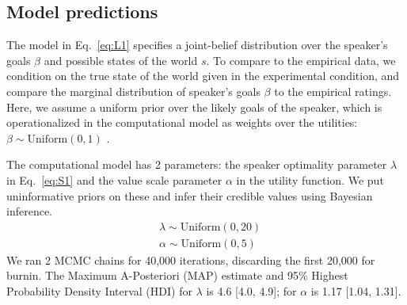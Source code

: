 \documentclass[10pt,letterpaper]{article}
\begin{document}
\subsection{Model predictions}

The model in Eq.~\ref{eq:L1} specifies a joint-belief distribution over the speaker's goals $\beta$ and possible states of the world $s$.
To compare to the empirical data, we condition on the true state of the world given in the experimental condition, and compare the marginal distribution of speaker's goals $\beta$ to the empirical ratings.
Here, we assume a uniform prior over the likely goals of the speaker, which is operationalized in the computational model as weights over the utilities: $\beta \sim \text{Uniform}(0,1)$ .

The computational model has 2 parameters: the speaker optimality parameter $\lambda$ in Eq.~\ref{eq:S1} and the value scale parameter $\alpha$ in the utility function. 
We put uninformative priors on these and infer their credible values using Bayesian inference.
\begin{eqnarray*}
& \lambda \sim \text{Uniform}(0,20)\\
& \alpha \sim \text{Uniform}(0, 5)
\end{eqnarray*}
We ran 2 MCMC chains for 40,000 iterations, discarding the first 20,000 for burnin.
The Maximum A-Posteriori (MAP) estimate and 95\% Highest Probability Density Interval (HDI) for $\lambda$ is 4.6 [4.0, 4.9]; for $\alpha$ is 1.17 [1.04, 1.31].%


\end{document}
